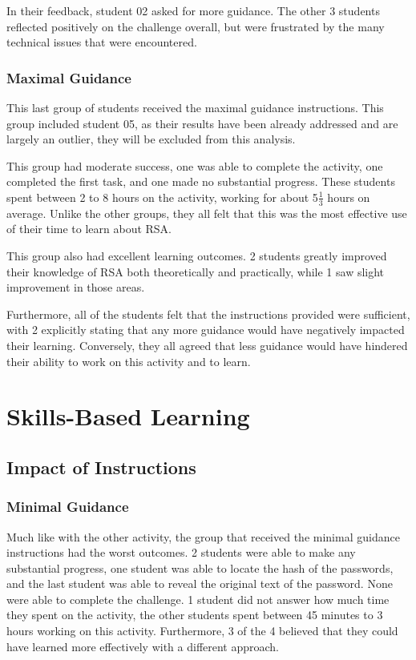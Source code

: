             In their feedback, student 02 asked for more guidance. 
            The other 3 students reflected positively on the challenge overall, but were frustrated by the many technical issues that were encountered. 

        \subsubsection*{Maximal Guidance}
            This last group of students received the maximal guidance instructions. 
            This group included student 05, as their results have been already addressed and are largely an outlier, they will be excluded from this analysis. 

            This group had moderate success, one was able to complete the activity, one completed the first task, and one made no substantial progress. 
            These students spent between 2 to 8 hours on the activity, working for about 5$\frac{1}{3}$ hours on average. 
            Unlike the other groups, they all felt that this was the most effective use of their time to learn about RSA. 

            This group also had excellent learning outcomes. 
            2 students greatly improved their knowledge of RSA both theoretically and practically, while 1 saw slight improvement in those areas. 

            Furthermore, all of the students felt that the instructions provided were sufficient, with 2 explicitly stating that any more guidance would have negatively impacted their learning. 
            Conversely, they all agreed that less guidance would have hindered their ability to work on this activity and to learn.


\section{Skills-Based Learning}
    \subsection{Impact of Instructions}
        \subsubsection*{Minimal Guidance}
            Much like with the other activity, the group that received the minimal guidance instructions had the worst outcomes. 
            2 students were able to make any substantial progress, one student was able to locate the hash of the passwords, and the last student was able to reveal the original text of the password. 
            None were able to complete the challenge. 
            1 student did not answer how much time they spent on the activity, the other students spent between 45 minutes to 3 hours working on this activity. 
            Furthermore, 3 of the 4 believed that they could have learned more effectively with a different approach.

